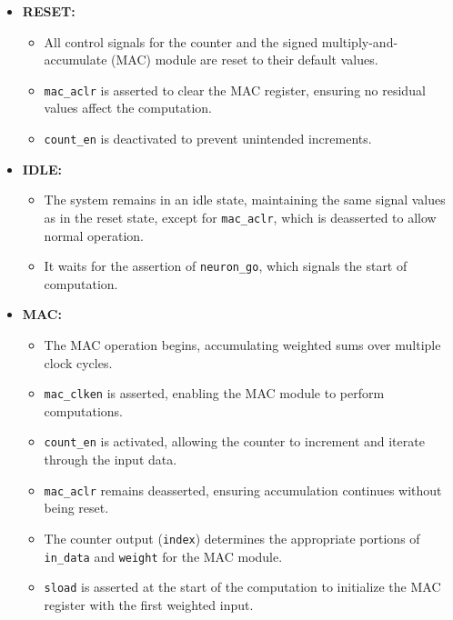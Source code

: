 \documentclass[11pt]{report}
\begin{document}
\begin{itemize}
    \item \textbf{RESET:}  
    \begin{itemize}
        \item All control signals for the counter and the signed multiply-and-accumulate (MAC) module are reset to their default values.  
        \item \texttt{mac\_aclr} is asserted to clear the MAC register, ensuring no residual values affect the computation.  
        \item \texttt{count\_en} is deactivated to prevent unintended increments.  
    \end{itemize}
    
    \item \textbf{IDLE:}  
    \begin{itemize}
        \item The system remains in an idle state, maintaining the same signal values as in the reset state, except for \texttt{mac\_aclr}, which is deasserted to allow normal operation.  
        \item It waits for the assertion of \texttt{neuron\_go}, which signals the start of computation.  
    \end{itemize}
    
    \item \textbf{MAC:}  
    \begin{itemize}
        \item The MAC operation begins, accumulating weighted sums over multiple clock cycles.  
        \item \texttt{mac\_clken} is asserted, enabling the MAC module to perform computations.  
        \item \texttt{count\_en} is activated, allowing the counter to increment and iterate through the input data.  
        \item \texttt{mac\_aclr} remains deasserted, ensuring accumulation continues without being reset.  
        \item The counter output (\texttt{index}) determines the appropriate portions of \texttt{in\_data} and \texttt{weight} for the MAC module.  
        \item \texttt{sload} is asserted at the start of the computation to initialize the MAC register with the first weighted input.  
    \end{itemize}
    

\end{itemize}
\end{document}
